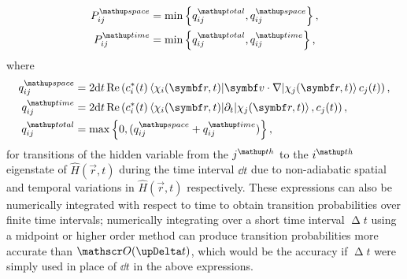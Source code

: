 \begin{align}
P^\up{space}_{ij} &= \min\left\{q^\up{total}_{ij}, q^\up{space}_{ij}\right\},\\
P^\up{time}_{ij} &= \min\left\{q^\up{total}_{ij}, q^\up{time}_{ij}\right\},
\end{align}
where
\begin{align}
q^\up{space}_{ij} &= 2\dd t\re\left(c_i^*(t)
\matrixel{\chi_i(\vec r, t)}{\vec v\cdot\nabla}{\chi_j(\vec r, t)}
 c_j(t)\right),\label{eq:q_space}\\
q^\up{time}_{ij} &= 2\dd t\re\left(c_i^*(t)
\matrixel{\chi_i(\vec r, t)}{\partial_t}{\chi_j(\vec r, t)},
 c_j(t)\right),\label{eq:q_time}\\
q^\up{total}_{ij} &= \max\left\{0, (q^\up{space}_{ij} + q^\up{time}_{ij})\right\},
\end{align}
for transitions of the hidden variable from the $j^\up{th}$ to the $i^\up{th}$ eigenstate of $\hat H(\vec r, t)$ during the time interval $\dd t$ due to non-adiabatic spatial and temporal variations in $\hat H(\vec r, t)$ respectively. These expressions can also be numerically integrated with respect to time to obtain transition probabilities over finite time intervals; numerically integrating over a short time interval $\upDelta t$ using a midpoint or higher order method can produce transition probabilities more accurate than $\Ord{\upDelta t}$, which would be the accuracy if $\upDelta t$ were simply used in place of $\dd t$ in the above expressions.

